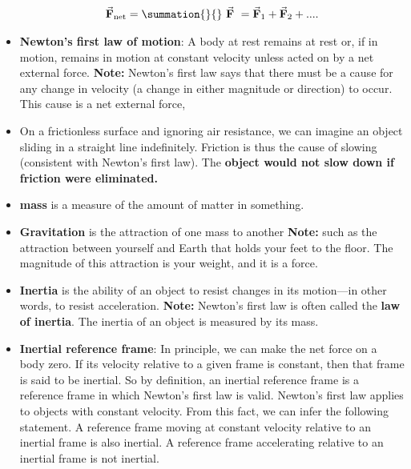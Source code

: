 \documentclass{report}
\begin{document}
\begin{itemize}
                \begin{align*}
                    \vec{\mathbf{F}}_{\text{net}} = \summation{}{}\  \vec{\mathbf{F}}\ = \vec{\mathbf{F}}_{1} + \vec{\mathbf{F}}_{2} + ...
                .\end{align*}
            \item \textbf{Newton's first law of motion}: A body at rest remains at rest or, if in motion, remains in motion at constant velocity unless acted on by a net external force.
                \bigbreak \noindent 
                \textbf{Note:} Newton’s first law says that there must be a cause for any change in velocity (a change in either magnitude or direction) to occur. This cause is a net external force,
            \item On a frictionless surface and ignoring air resistance, we can imagine an object sliding in a straight line indefinitely. Friction is thus the cause of slowing (consistent with Newton’s first law). The \textbf{object would not slow down if friction were eliminated.}
            \item \textbf{mass} is a measure of the amount of matter in something.
            \item \textbf{Gravitation} is the attraction of one mass to another
                \bigbreak \noindent 
                \textbf{Note:} such as the attraction between yourself and Earth that holds your feet to the floor. The magnitude of this attraction is your weight, and it is a force.
            \item \textbf{Inertia} is the ability of an object to resist changes in its motion—in other words, to resist acceleration.
                \bigbreak \noindent 
                \textbf{Note:} Newton’s first law is often called the \textbf{law of inertia}. The inertia of an object is measured by its mass.
            \item \textbf{Inertial reference frame}: In principle, we can make the net force on a body zero. If its velocity relative to a given frame is constant, then that frame is said to be inertial.
                \bigbreak \noindent 
                So by definition, an inertial reference frame is a reference frame in which Newton’s first law is valid. Newton’s first law applies to objects with constant velocity. From this fact, we can infer the following statement.
                \bigbreak \noindent 
                A reference frame moving at constant velocity relative to an inertial frame is also inertial. A reference frame accelerating relative to an inertial frame is not inertial.

\end{itemize}
\end{document}
